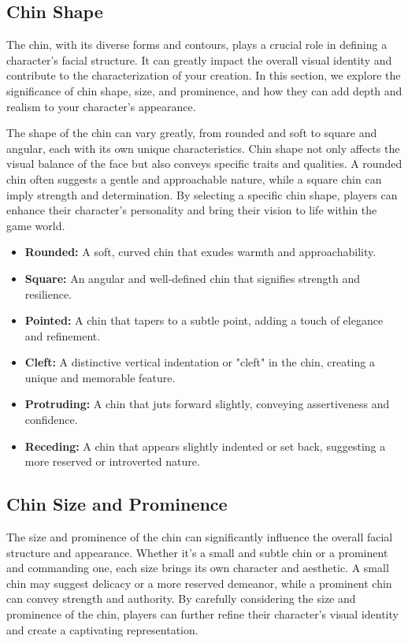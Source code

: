\documentclass[12pt]{book}
\begin{document}
\subsection{\textbf{Chin Shape}}

The chin, with its diverse forms and contours, plays a crucial role in defining a character's facial structure. It can greatly impact the overall visual identity and contribute to the characterization of your creation. In this section, we explore the significance of chin shape, size, and prominence, and how they can add depth and realism to your character's appearance.

The shape of the chin can vary greatly, from rounded and soft to square and angular, each with its own unique characteristics. Chin shape not only affects the visual balance of the face but also conveys specific traits and qualities. A rounded chin often suggests a gentle and approachable nature, while a square chin can imply strength and determination. By selecting a specific chin shape, players can enhance their character's personality and bring their vision to life within the game world.

\begin{itemize}
    \item \textbf{Rounded:} A soft, curved chin that exudes warmth and approachability.
    \item \textbf{Square:} An angular and well-defined chin that signifies strength and resilience.
    \item \textbf{Pointed:} A chin that tapers to a subtle point, adding a touch of elegance and refinement.
    \item \textbf{Cleft:} A distinctive vertical indentation or "cleft" in the chin, creating a unique and memorable feature.
    \item \textbf{Protruding:} A chin that juts forward slightly, conveying assertiveness and confidence.
    \item \textbf{Receding:} A chin that appears slightly indented or set back, suggesting a more reserved or introverted nature.
\end{itemize}

\subsection{\textbf{Chin Size and Prominence}}

The size and prominence of the chin can significantly influence the overall facial structure and appearance. Whether it's a small and subtle chin or a prominent and commanding one, each size brings its own character and aesthetic. A small chin may suggest delicacy or a more reserved demeanor, while a prominent chin can convey strength and authority. By carefully considering the size and prominence of the chin, players can further refine their character's visual identity and create a captivating representation.
\end{document}
